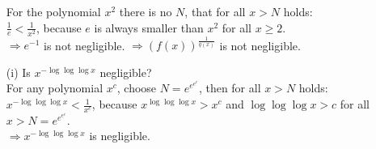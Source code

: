 \begin{itemize}
		For the polynomial \(x^{2}\) there is no \(N\), that for all \(x > N\) holds: \\
		\(\frac{1}{e}  < \frac{1}{x^2}\), because \(e\) is always smaller than \(x^{2}\) for all \(x \ge 2\).\\
		\( \Rightarrow e^{-1}\) is not negligible.	\(\Rightarrow (f(x))^\frac{1}{q(x)}\) is not negligible.
\item[(i)]
		Is \(x^{-\log \log \log x}\) negligible?\\
		For any polynomial \(x^c\), choose \(N=e^{e^{e^c}}\), then for all \(x > N\) holds:\\
		\(x^{-\log \log \log x} < \frac{1}{x^c}\), because \(x^{\log \log \log x} > x^c\) and \(\log \log \log x > c\) for all \(x > N = e^{e^{e^c}}\).\\
		\( \Rightarrow x^{-\log \log \log x}\) is negligible.
\end{itemize}

